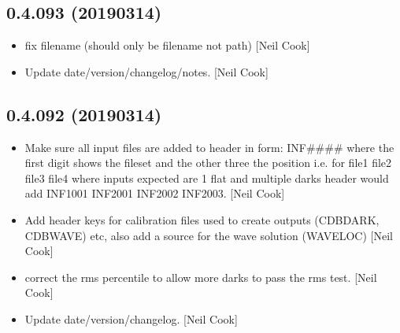 \documentclass[a4paper,10pt,english]{report}
\begin{document}
\subsection{0.4.093 (2019\sphinxhyphen{}03\sphinxhyphen{}14)}
\label{\detokenize{misc/changelog:id186}}\begin{itemize}
\item {} 
 \sphinxhyphen{} fix filename (should only be filename not
path) {[}Neil Cook{]}

\item {} 
Update date/version/changelog/notes. {[}Neil Cook{]}

\end{itemize}


\subsection{0.4.092 (2019\sphinxhyphen{}03\sphinxhyphen{}14)}
\label{\detokenize{misc/changelog:id187}}\begin{itemize}
\item {} 
Make sure all input files are added to header in form: INF\#\#\#\# where
the first digit shows the file\sphinxhyphen{}set and the other three the position
i.e. for   file1 file2 file3 file4   where inputs
expected are 1 flat and multiple darks header would add INF1001
INF2001 INF2002 INF2003. {[}Neil Cook{]}

\item {} 
Add header keys for calibration files used to create outputs (CDBDARK,
CDBWAVE) etc, also add a source for the wave solution (WAVELOC) {[}Neil
Cook{]}

\item {} 
 \sphinxhyphen{} correct the rms percentile to allow more darks to
pass the rms test. {[}Neil Cook{]}

\item {} 
Update date/version/changelog. {[}Neil Cook{]}

\end{itemize}
\end{document}
